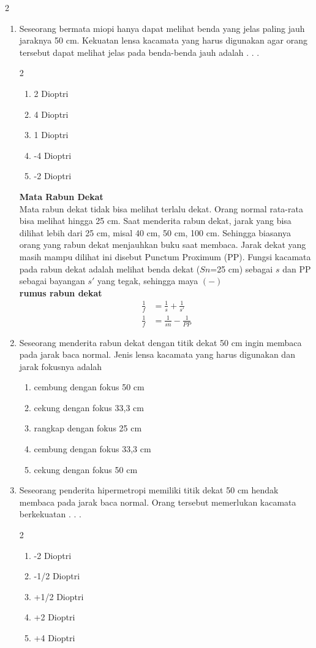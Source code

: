 \documentclass[10pt,a4paper]{extarticle}
\newcommand*\pilgan[1]{
\begin{enumerate}[label=\Alph*., itemsep=0pt,topsep=0pt,leftmargin=*,align=Center] #1 
\end{enumerate}}
\newcommand{\pilgani}[1]{                            \vspace{-0.3cm}\begin{multicols}{2}
 \begin{enumerate}[label=\Alph*., itemsep=0pt,topsep=0pt,leftmargin=*,align=Center]#1                     \end{enumerate}
 \phantom{ini cuma sapi, wedus, dan ayam}
 \end{multicols}}
\begin{document}
\begin{multicols*}{2}
\begin{enumerate}
\item Seseorang bermata miopi hanya dapat melihat benda yang jelas paling jauh jaraknya 50 cm. Kekuatan lensa kacamata yang harus digunakan agar orang tersebut dapat melihat jelas pada benda-benda jauh adalah . . .
\pilgani{
	\item 2 Dioptri
	\item 4 Dioptri
	\item 1 Dioptri
	\item -4 Dioptri
	\item -2 Dioptri }
\vspace{3cm}

\textbf{Mata Rabun Dekat}\\
Mata rabun dekat tidak bisa melihat terlalu dekat. Orang normal rata-rata bisa melihat hingga 25 cm. Saat menderita rabun dekat, jarak yang bisa dilihat lebih dari 25 cm, misal 40 cm, 50 cm, 100 cm. Sehingga biasanya orang yang rabun dekat menjauhkan buku saat membaca. Jarak dekat yang masih mampu dilihat ini disebut Punctum Proximum (PP). Fungsi kacamata pada rabun dekat adalah melihat benda dekat ($Sn$=25 cm) sebagai $s$ dan PP sebagai bayangan $s'$ yang tegak, sehingga maya $(-)$\\
\vspace{1cm}
\textbf{rumus rabun dekat}
\vspace{-0.7cm}
\begin{align*}
\frac{1}{f} &= \frac{1}{s}+\frac{1}{s'}\\
\frac{1}{f} &= \frac{1}{sn} - \frac{1}{PP}
\end{align*}

\item Seseorang menderita rabun dekat dengan titik dekat 50 cm ingin membaca pada jarak baca normal. Jenis lensa kacamata yang harus digunakan dan jarak fokusnya adalah 
\pilgan{
	\item cembung dengan fokus 50 cm
	\item cekung dengan fokus 33,3 cm
	\item rangkap dengan fokus 25 cm
	\item cembung dengan fokus 33,3 cm
	\item cekung dengan fokus 50 cm }
\vspace{2cm}

\item Seseorang penderita hipermetropi memiliki titik dekat 50 cm hendak membaca pada jarak baca normal. Orang tersebut memerlukan kacamata berkekuatan . . . 
\pilgani{
	\item -2 Dioptri
	\item -1/2 Dioptri
	\item +1/2 Dioptri
	\item +2 Dioptri
	\item +4 Dioptri }
\vspace{2cm}



\end{enumerate}
\end{multicols*}
\end{document}
